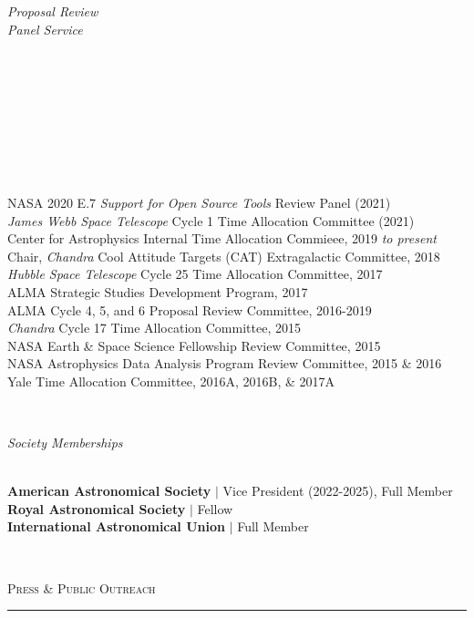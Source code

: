 \documentclass[11pt]{article}
\makeatletter
\def\vhrulefill#1{\leavevmode\leaders\hrule\@height#1\hfill \kern\z@}
\makeatother
\begin{document}
\hspace{2.5mm} \parbox{1.5in}{\textit{Proposal Review \\ Panel Service \\\\\\\\\\\\\\\\\\}} \parbox{5.15in}{NASA 2020 E.7 \textit{Support for Open Source Tools} Review Panel (2021)\\
\textit{James Webb Space Telescope} Cycle 1 Time Allocation Committee (2021)\\
Center for Astrophysics Internal Time Allocation Commieee, 2019 \textit{to present} \\
Chair, \textit{Chandra} Cool Attitude Targets (CAT) Extragalactic Committee, 2018\\
\textit{Hubble Space Telescope} Cycle 25 Time Allocation Committee, 2017 \\
ALMA Strategic Studies Development Program, 2017 \\
ALMA Cycle 4, 5, and 6 Proposal Review Committee, 2016-2019 \\\textit{Chandra} Cycle 17 Time Allocation Committee, 2015  \\ NASA Earth \& Space Science Fellowship Review Committee, 2015 \\
NASA Astrophysics Data Analysis Program Review Committee, 2015 \& 2016 \\
Yale Time Allocation Committee, 2016A, 2016B, \& 2017A} \\

\vspace{4mm}


\hspace{2.5mm} \parbox{1.5in}{\textit{Society Memberships \\\\}} \parbox{5.15in}{ \textbf{American Astronomical Society} $|$ Vice President (2022-2025), Full Member \\ \textbf{Royal Astronomical Society} $|$ Fellow \\ \textbf{International Astronomical Union} $|$ Full Member}\\

\vspace{4mm}

\textsc{Press \& Public Outreach} \vhrulefill{0.4pt}
\end{document}
